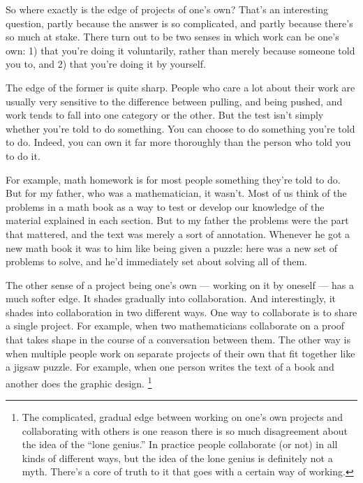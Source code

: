 \documentclass[12pt]{book}
\begin{document}
So where exactly is the edge of projects of one's own? That's an
interesting question, partly because the answer is so complicated, and
partly because there's so much at stake. There turn out to be two senses
in which work can be one's own: 1) that you're doing it voluntarily,
rather than merely because someone told you to, and 2) that you're doing
it by yourself.

The edge of the former is quite sharp. People who care a lot about their
work are usually very sensitive to the difference between pulling, and
being pushed, and work tends to fall into one category or the other. But
the test isn't simply whether you're told to do something. You can
choose to do something you're told to do. Indeed, you can own it far
more thoroughly than the person who told you to do it.

For example, math homework is for most people something they're told to
do. But for my father, who was a mathematician, it wasn't. Most of us
think of the problems in a math book as a way to test or develop our
knowledge of the material explained in each section. But to my father
the problems were the part that mattered, and the text was merely a sort
of annotation. Whenever he got a new math book it was to him like being
given a puzzle: here was a new set of problems to solve, and he'd
immediately set about solving all of them.

The other sense of a project being one's own --- working on it by
oneself --- has a much softer edge. It shades gradually into
collaboration. And interestingly, it shades into collaboration in two
different ways. One way to collaborate is to share a single project. For
example, when two mathematicians collaborate on a proof that takes shape
in the course of a conversation between them. The other way is when
multiple people work on separate projects of their own that fit together
like a jigsaw puzzle. For example, when one person writes the text of a
book and another does the graphic design. \footnote{The complicated, gradual edge between working on one's own
projects and collaborating with others is one reason there is so much
disagreement about the idea of the ``lone genius.'' In practice people
collaborate (or not) in all kinds of different ways, but the idea of the
lone genius is definitely not a myth. There's a core of truth to it that
goes with a certain way of working.}
\end{document}
